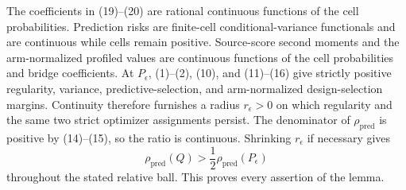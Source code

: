The coefficients in (19)--(20) are rational continuous functions of the cell probabilities. Prediction risks are finite-cell conditional-variance functionals and are continuous while cells remain positive. Source-score second moments and the arm-normalized profiled values are continuous functions of the cell probabilities and bridge coefficients. At \(P_\epsilon\), (1)--(2), (10), and (11)--(16) give strictly positive regularity, variance, predictive-selection, and arm-normalized design-selection margins. Continuity therefore furnishes a radius \(r_\epsilon>0\) on which regularity and the same two strict optimizer assignments persist. The denominator of \(\rho_{\mathrm{pred}}\) is positive by (14)--(15), so the ratio is continuous. Shrinking \(r_\epsilon\) if necessary gives
\[
 \rho_{\mathrm{pred}}(Q)>\frac12\rho_{\mathrm{pred}}(P_\epsilon)
\]
throughout the stated relative ball. This proves every assertion of the lemma.